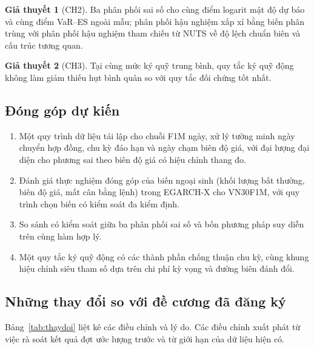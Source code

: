 \documentclass[12pt,a4paper]{article}
\theoremstyle{definition}
\newtheorem{giathuyet}{Giả thuyết}
\theoremstyle{remark}
\begin{document}
\begin{giathuyet}[CH2]\label{gt:2}
Ba phân phối sai số cho cùng điểm logarit mật độ dự báo và cùng điểm VaR--ES ngoài mẫu; phân phối hậu nghiệm xấp xỉ bằng biến phân trùng với phân phối hậu nghiệm tham chiếu từ NUTS về độ lệch chuẩn biên và cấu trúc tương quan.
\end{giathuyet}

\begin{giathuyet}[CH3]\label{gt:3}
Tại cùng mức ký quỹ trung bình, quy tắc ký quỹ động không làm giảm thiếu hụt bình quân so với quy tắc đối chứng tốt nhất.
\end{giathuyet}

\subsection{Đóng góp dự kiến}

\begin{enumerate}
\item Một quy trình dữ liệu tái lập cho chuỗi F1M ngày, xử lý tường minh ngày chuyển hợp đồng, chu kỳ đáo hạn và ngày chạm biên độ giá, với đại lượng đại diện cho phương sai theo biên độ giá có hiệu chỉnh thang đo.
\item Đánh giá thực nghiệm đóng góp của biến ngoại sinh (khối lượng bất thường, biên độ giá, mất cân bằng lệnh) trong EGARCH-X cho VN30F1M, với quy trình chọn biến có kiểm soát đa kiểm định.
\item So sánh có kiểm soát giữa ba phân phối sai số và bốn phương pháp suy diễn trên cùng hàm hợp lý.
\item Một quy tắc ký quỹ động có các thành phần chống thuận chu kỳ, cùng khung hiệu chỉnh siêu tham số dựa trên chi phí kỳ vọng và đường biên đánh đổi.
\end{enumerate}

\subsection{Những thay đổi so với đề cương đã đăng ký}\label{sec:thaydoi}

Bảng~\ref{tab:thaydoi} liệt kê các điều chỉnh và lý do. Các điều chỉnh xuất phát từ việc rà soát kết quả đợt ước lượng trước và từ giới hạn của dữ liệu hiện có.
\end{document}
